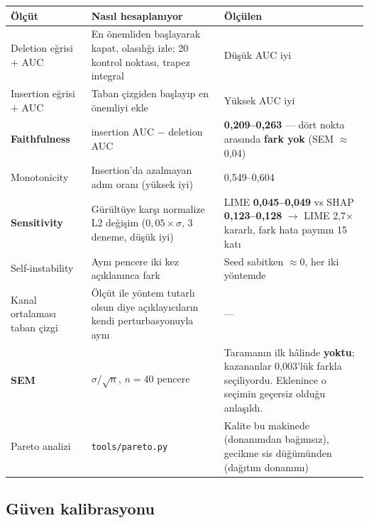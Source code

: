 \documentclass[11pt,a4paper]{article}
\newcommand{\dosya}[1]{\texttt{\footnotesize #1}}
\begin{document}
\begin{longtable}{@{}p{3.4cm}p{6.0cm}p{6.1cm}@{}}
\toprule
\textbf{Ölçüt} & \textbf{Nasıl hesaplanıyor} & \textbf{Ölçülen} \\
\midrule
\endhead
Deletion eğrisi + AUC & En önemliden başlayarak kapat, olasılığı izle; 20
kontrol noktası, trapez integral & Düşük AUC iyi \\
\addlinespace
Insertion eğrisi + AUC & Taban çizgiden başlayıp en önemliyi ekle & Yüksek AUC iyi \\
\addlinespace
\textbf{Faithfulness} & insertion AUC $-$ deletion AUC &
\textbf{0{,}209--0{,}263} --- dört nokta arasında \textbf{fark yok}
(SEM $\approx$0{,}04) \\
\addlinespace
Monotonicity & Insertion'da azalmayan adım oranı (yüksek iyi) & 0{,}549--0{,}604 \\
\addlinespace
\textbf{Sensitivity} & Gürültüye karşı normalize L2 değişim
($0{,}05\times\sigma$, 3 deneme, düşük iyi) &
LIME \textbf{0{,}045--0{,}049} vs SHAP \textbf{0{,}123--0{,}128} $\rightarrow$
LIME 2{,}7$\times$ kararlı, fark hata payının 15 katı \\
\addlinespace
Self-instability & Aynı pencere iki kez açıklanınca fark & Seed sabitken
$\approx$0, her iki yöntemde \\
\addlinespace
Kanal ortalaması taban çizgi & Ölçüt ile yöntem tutarlı olsun diye
açıklayıcıların kendi perturbasyonuyla aynı & --- \\
\addlinespace
\textbf{SEM} & $\sigma/\sqrt{n}$, $n=40$ pencere &
Taramanın ilk hâlinde \textbf{yoktu}; kazananlar 0{,}003'lük farkla
seçiliyordu. Eklenince o seçimin geçersiz olduğu anlaşıldı. \\
\addlinespace
Pareto analizi & \dosya{tools/pareto.py} & Kalite bu makinede (donanımdan
bağımsız), gecikme sis düğümünden (dağıtım donanımı) \\
\bottomrule
\end{longtable}

\subsection{Güven kalibrasyonu}
\end{document}
